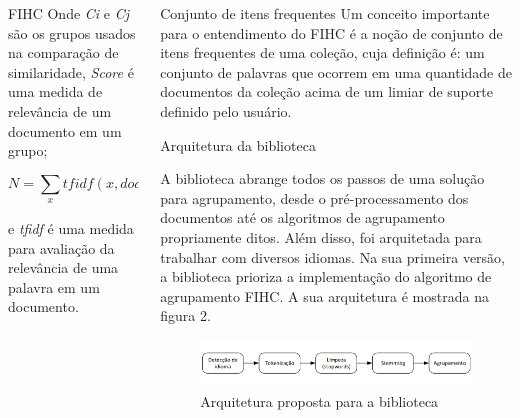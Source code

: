 \documentclass[final]{beamer}
\newlength{\onecolwid}
\newlength{\twocolwid}
\begin{document}
\begin{frame}[t]
\begin{columns}[t]
\begin{column}{\twocolwid}
\begin{columns}[t,totalwidth=\twocolwid]
\begin{column}{\onecolwid}
\begin{block}{FIHC}
Onde \textit{Ci} e \textit{Cj} são os grupos usados na comparação de similaridade, \textit{Score} é uma medida de relevância de um documento em um grupo;

\begin{equation}
N = \sum_{x}tfidf(x, doc(Cj)) + \sum_{x'}tfidf(x', doc(Cj))
\label{eqn:Sim_N}
\end{equation}

e \textit{tfidf} é uma medida para avaliação da relevância de uma palavra em um documento.

\end{block}


\end{column} %

\begin{column}{\onecolwid}\vspace{-.6in} %


\begin{block}{Conjunto de itens frequentes}
Um conceito importante para o entendimento do FIHC é a noção de conjunto de itens frequentes de uma coleção, cuja definição é: um conjunto de palavras que ocorrem em uma quantidade de documentos da coleção acima de um limiar de suporte definido pelo usuário.
\end{block}

\begin{block}{Arquitetura da biblioteca}

A biblioteca abrange todos os passos de uma solução para agrupamento, desde o pré-processamento dos documentos até os algoritmos de agrupamento propriamente ditos. Além disso, foi arquitetada para trabalhar com diversos idiomas. Na sua primeira versão, a biblioteca prioriza a implementação do algoritmo de agrupamento FIHC. A sua arquitetura é mostrada na figura 2.

\begin{figure}
\includegraphics[width=1\linewidth]{arquitetura.png}
\caption{Arquitetura proposta para a biblioteca}
\end{figure}


\end{block}
\end{column}
\end{columns}
\end{column}
\end{columns}
\end{frame}
\end{document}
